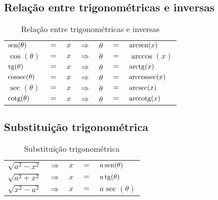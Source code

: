 \subsection{Relação entre trigonométricas e inversas}
	\begin{table}[H]
		\centering
		\begin{tabular}{|lclclcl|}
			$\operatorname{sen} (\theta)$    & $=$ & $x$ & $\Rightarrow$ & $\theta$ & $=$ & $\operatorname{arcsen} (x)$    \\
			$\cos (\theta)$    & $=$ & $x$ & $\Rightarrow$ & $\theta$ & $=$ & $\arccos (x)$    \\
			$\operatorname{tg} (\theta)$     & $=$ & $x$ & $\Rightarrow$ & $\theta$ & $=$ & $\operatorname{arctg} (x)$     \\
			$\operatorname{cossec} (\theta)$ & $=$ & $x$ & $\Rightarrow$ & $\theta$ & $=$ & $\operatorname{arccossec} (x)$ \\
			$\sec (\theta)$    & $=$ & $x$ & $\Rightarrow$ & $\theta$ & $=$ & $\operatorname{arcsec} (x)$    \\
			$\operatorname{cotg} (\theta)$   & $=$ & $x$ & $\Rightarrow$ & $\theta$ & $=$ & $\operatorname{arccotg} (x)$
		\end{tabular}
		\caption{Relação entre trigonométricas e inversas}
		\label{relacao_trigonometricas_inversas}
	\end{table}

\subsection{Substituição trigonométrica}
	\begin{table}[H]
		\centering
		\begin{tabular}{|lclcl|}
			$\sqrt{a^2 - x^2}$ & $\Rightarrow$ & $x$ & $=$ & $a\operatorname{sen} (\theta)$ \\
			$\sqrt{a^2 + x^2}$ & $\Rightarrow$ & $x$ & $=$ & $a\operatorname{tg} (\theta)$  \\
			$\sqrt{x^2 - a^2}$ & $\Rightarrow$ & $x$ & $=$ & $a\sec (\theta)$
		\end{tabular}
		\caption{Substituição trigonométrica}
		\label{substituicao_trigonometrica}
	\end{table}



